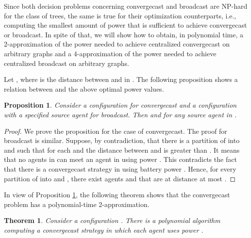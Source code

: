 \documentclass{article}
\newtheorem{theorem}{Theorem}
\newtheorem{proposition}{Proposition}
\newcommand\strat{\mbox{strategy}\xspace}
\newcommand\ccast{convergecast\xspace}
\newcommand\cccast{centralized convergecast\xspace}
\begin{document}
Since both decision problems concerning convergecast and broadcast are NP-hard for the class of trees, the same is true for their optimization counterparts, i.e., computing the smallest amount of power that is sufficient to achieve convergecast or broadcast.
In spite of that, we will show how to obtain, in polynomial time, a 2-approximation of the power needed to achieve {\cccast} on arbitrary graphs and a 4-approximation of the power needed to achieve centralized broadcast on arbitrary graphs. 

Let , where  is the distance between  and  in . The following proposition shows a relation between  and the above optimal power values.

\begin{proposition}\label{lem:twice-p}
Consider a configuration  for convergecast and a configuration  with a specified source agent for broadcast. Then  and  for any source agent in .
\end{proposition}

\begin{proof}
We prove the proposition for the case of convergecast. The proof for broadcast is similar.
Suppose, by contradiction, that there is a partition of  into  and  such that for each  and  the distance between  and  is greater than . It means that no agents in  can meet an agent in  using power . This contradicts the fact that there is a {\ccast} {\strat} in  using battery power . Hence, for every partition of  into  and , there exist agents  and  that are at distance at most .
\end{proof}

In view of Proposition \ref{lem:twice-p}, the following theorem shows that the convergecast problem has a polynomial-time 2-approximation.

\begin{theorem}\label{cor:FourApr}
Consider a configuration . There is a polynomial algorithm computing a {\ccast} strategy in which each agent uses power .
\end{theorem}
\end{document}
